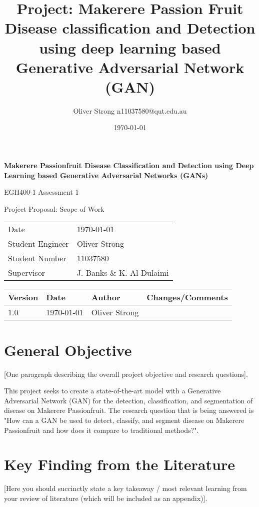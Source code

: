 \documentclass[11pt]{article}
\title{Project: Makerere Passion Fruit Disease classification and Detection using deep learning based Generative Adversarial Network (GAN)}
\author{Oliver Strong n11037580@qut.edu.au}
\date{\today}
\begin{document}
\begin{titlepage}
    \begin{center}
        \vspace*{1cm}
        {\huge \textbf{Makerere Passionfruit Disease Classification and Detection using Deep Learning based Generative Adversarial Networks (GANs)}}
        
        \vspace{0.5cm}
        {\Large EGH400-1 Assessment 1
        
        Project Proposal: Scope of Work}

        \vspace{0.5cm}
        \begin{tabular}{ll}
            Date & \today \\
            Student Engineer & Oliver Strong \\
            Student Number & 11037580 \\
            Supervisor & J. Banks \& K. Al-Dulaimi\\
        \end{tabular}
    \end{center}
    \begin{tabularx}{\textwidth}{@{}lllX@{}}
        \toprule
        Version & Date & Author & Changes/Comments\\
        \midrule
        1.0 & \today & Oliver Strong & \\
        \bottomrule
    \end{tabularx}
    
    \tableofcontents
\end{titlepage}

\newpage
\section{General Objective}
[One paragraph describing the overall project objective and research questions].

This project seeks to create a state-of-the-art model with a Generative 
Adversarial Network (GAN) for the detection, classification, and 
segmentation of disease on Makerere Passionfruit. The research question
that is being answered is "How can a GAN be used to detect, classify, 
and segment disease on Makerere Passionfruit and how does it compare 
to traditional methods?".


\section{Key Finding from the Literature}
[Here you should succinctly state a key takeaway / most relevant learning from your review of
literature (which will be included as an appendix)].
\end{document}
